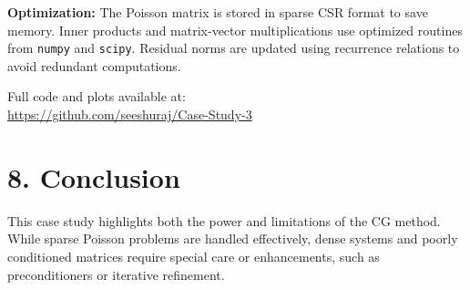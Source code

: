 \documentclass[a4paper,12pt]{article}
\begin{document}
\textbf{Optimization:} The Poisson matrix is stored in sparse CSR format to save memory. Inner products and matrix-vector multiplications use optimized routines from \texttt{numpy} and \texttt{scipy}. Residual norms are updated using recurrence relations to avoid redundant computations.

\vspace{0.3cm}
Full code and plots available at:  \\
\url{https://github.com/seeshuraj/Case-Study-3}

\section*{8. Conclusion}
This case study highlights both the power and limitations of the CG method. While sparse Poisson problems are handled effectively, dense systems and poorly conditioned matrices require special care or enhancements, such as preconditioners or iterative refinement.
\end{document}

